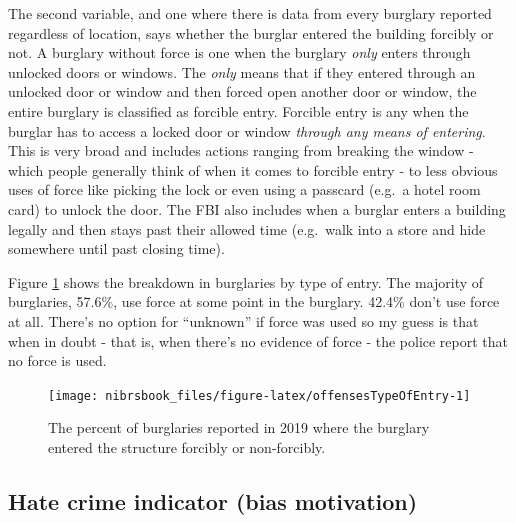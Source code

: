 \documentclass[
  12pt,
  openany]{book}
\begin{document}
The second variable, and one where there is data from every burglary reported regardless of location, says whether the burglar entered the building forcibly or not. A burglary without force is one when the burglary \emph{only} enters through unlocked doors or windows. The \emph{only} means that if they entered through an unlocked door or window and then forced open another door or window, the entire burglary is classified as forcible entry. Forcible entry is any when the burglar has to access a locked door or window \emph{through any means of entering}. This is very broad and includes actions ranging from breaking the window - which people generally think of when it comes to forcible entry - to less obvious uses of force like picking the lock or even using a passcard (e.g.~a hotel room card) to unlock the door. The FBI also includes when a burglar enters a building legally and then stays past their allowed time (e.g.~walk into a store and hide somewhere until past closing time).

Figure \ref{fig:offensesTypeOfEntry} shows the breakdown in burglaries by type of entry. The majority of burglaries, 57.6\%, use force at some point in the burglary. 42.4\% don't use force at all. There's no option for ``unknown'' if force was used so my guess is that when in doubt - that is, when there's no evidence of force - the police report that no force is used.

\begin{figure}

{\centering \texttt{[image: nibrsbook\_files/figure-latex/offensesTypeOfEntry-1]} 

}

\caption{The percent of burglaries reported in 2019 where the burglary entered the structure forcibly or non-forcibly.}\label{fig:offensesTypeOfEntry}
\end{figure}

\hypertarget{hate-crime-indicator-bias-motivation}{%
\subsection{Hate crime indicator (bias motivation)}\label{hate-crime-indicator-bias-motivation}}
\end{document}
